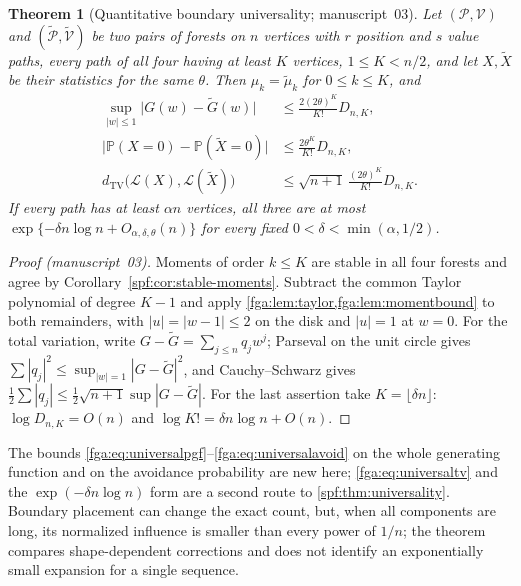 \documentclass[11pt]{article}
\numberwithin{equation}{section}
\newtheorem{theorem}{Theorem}[section]
\theoremstyle{definition}
\theoremstyle{remark}
\theoremstyle{definition}
\newcommand{\Pp}{\mathbb P}
\newcommand{\TV}{d_{\mathrm{TV}}}
\begin{document}
\begin{theorem}[Quantitative boundary universality; manuscript~03]
\label{fga:thm:universal}
Let $(\mathcal P,\mathcal V)$ and $(\widetilde{\mathcal P},\widetilde{\mathcal V})$
be two pairs of forests on $n$ vertices with $r$ position and $s$ value
paths, every path of all four having at least $K$ vertices, $1\le K<n/2$,
and let $X,\widetilde X$ be their statistics for the same $\theta$. Then
$\mu_k=\widetilde\mu_k$ for $0\le k\le K$, and
\begin{align}
 \sup_{|w|\le1}\bigl|G(w)-\widetilde G(w)\bigr|
 &\le\frac{2(2\theta)^K}{K!}D_{n,K},\label{fga:eq:universalpgf}\\
 \bigl|\Pp(X=0)-\Pp(\widetilde X=0)\bigr|
 &\le\frac{2\theta^K}{K!}D_{n,K},\label{fga:eq:universalavoid}\\
 \TV\bigl(\mathcal L(X),\mathcal L(\widetilde X)\bigr)
 &\le\sqrt{n+1}\,\frac{(2\theta)^K}{K!}D_{n,K}.\label{fga:eq:universaltv}
\end{align}
If every path has at least $\alpha n$ vertices, all three are at most
$\exp\{-\delta n\log n+O_{\alpha,\delta,\theta}(n)\}$ for every fixed
$0<\delta<\min(\alpha,1/2)$.
\end{theorem}
\begin{proof}[Proof (manuscript~03)]
Moments of order $k\le K$ are stable in all four forests and agree by
Corollary~\ref{spf:cor:stable-moments}. Subtract the common Taylor polynomial of
degree $K-1$ and apply \cref{fga:lem:taylor,fga:lem:momentbound} to both
remainders, with $|u|=|w-1|\le2$ on the disk and $|u|=1$ at $w=0$. For the
total variation, write $G-\widetilde G=\sum_{j\le n}q_jw^j$; Parseval on
the unit circle gives $\sum|q_j|^2\le\sup_{|w|=1}|G-\widetilde G|^2$, and
Cauchy--Schwarz gives
$\frac12\sum|q_j|\le\frac12\sqrt{n+1}\sup|G-\widetilde G|$. For the last
assertion take $K=\lfloor\delta n\rfloor$: $\log D_{n,K}=O(n)$ and
$\log K!=\delta n\log n+O(n)$.
\end{proof}

The bounds \eqref{fga:eq:universalpgf}--\eqref{fga:eq:universalavoid} on
the whole generating function and on the avoidance probability are new
here; \eqref{fga:eq:universaltv} and the $\exp(-\delta n\log n)$ form are a
second route to \cref{spf:thm:universality}. Boundary placement can change
the exact count, but, when all components are long, its normalized
influence is smaller than every power of $1/n$; the theorem compares
shape-dependent corrections and does not identify an exponentially small
expansion for a single sequence.
\end{document}
